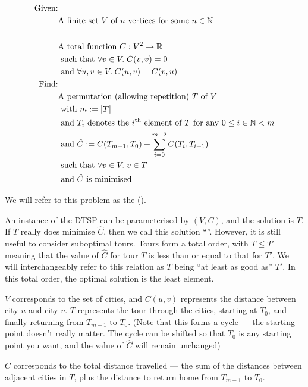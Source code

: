 \begin{align*}
  \textrm{Given:} & \\
  &\textrm{A finite set }V\textrm{ of }n\textrm{ vertices for some }n\in\mathbb{N} \\ \\
  &\textrm{A total function }C : V^2\rightarrow\mathbb{R} \\
  &\textrm{ such that }\forall v \in V.\; C(v,v)=0 \\
  &\textrm{ and }\forall u,v \in V.\; C(u,v)=C(v,u) \\
  \textrm{Find:} & \\
  &\textrm{A permutation (allowing repetition) }T\textrm{ of }V \\
  &\textrm{ with }m:=\left|T\right| \\
  &\textrm{ and }T_i\textrm{ denotes the }i\textrm{\textsuperscript{th} element of }T\textrm{ for any }0\leq i\in \mathbb{N}<m \\
  &\textrm{ and }\hat{C}:=C(T_{m-1},T_0)+\sum_{i=0}^{m-2}C(T_i,T_{i+1}) \\
  &\textrm{ such that }\forall v\in V.\; v\in T \\
  &\textrm{ and }\hat{C}\textrm{ is minimised }
\end{align*}

We will refer to this problem as the  ().

An instance of the DTSP can be parameterised by $(V,C)$, and the solution is $T$. If $T$ really does minimise $\hat{C}$, then we call this solution ``''. However, it is still useful to consider suboptimal tours. Tours form a total order, with $T\leq T'$ meaning that the value of $\hat{C}$ for tour $T$ is less than or equal to that for $T'$. We will interchangeably refer to this relation as $T$ being ``at least as good as'' $T'$. In this total order, the optimal solution is the least element.

$V$ corresponds to the set of cities, and $C(u,v)$ represents the distance between city $u$ and city $v$. $T$ represents the tour through the cities, starting at $T_0$, and finally returning from $T_{m-1}$ to $T_0$. (Note that this forms a cycle --- the starting point doesn't really matter. The cycle can be shifted so that $T_0$ is any starting point you want, and the value of $\hat{C}$ will remain unchanged)

$\hat{C}$ corresponds to the total distance travelled --- the sum of the distances between adjacent cities in $T$, plus the distance to return home from $T_{m-1}$ to $T_0$.

